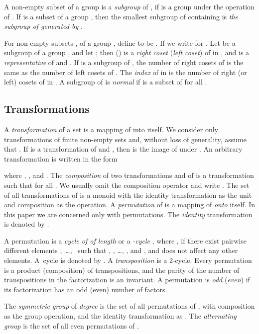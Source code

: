 \documentclass{llncs}
\begin{document}
A non-empty subset  of a group  is a \emph{subgroup} of , if 
 is a group under the operation of .
If  is a subset of a group , then the smallest subgroup of  containing  is \emph{the subgroup of  generated by }.

For non-empty subsets ,  of a group , define
 to be .
If  we write  for .
Let  be a subgroup of a group , and let ; then  () is a 
\emph{right coset} (\emph{left coset}) of  in , and  is a \emph{representative} of  and .
If  is a subgroup of , the number of right cosets of  is the same as the number of left cosets of . The \emph{index} of  in  is the number of right (or left) cosets of  in .
A subgroup  of  is \emph{normal} if  is a subset of  for all .


\subsection{Transformations}

A {\em transformation} of a set  is a mapping of  into itself. 
We consider only transformations of finite non-empty sets and, 
without loss of generality, assume that . If  is a transformation of 
and  , then  is the image of  under .  
An arbitrary transformation is written in the form

where , , and . 
The {\em composition} of two transformations  and  of  is a transformation  such that  for all . We usually omit the composition operator and write . 
The set of all transformations of  is a monoid with the identity transformation as the unit and composition as the operation.
A \emph{permutation} of  is a mapping of  \emph{onto} itself. 
In this paper we are concerned only with permutations.
The \emph{identity} transformation is denoted by .

A permutation  is a \emph{cycle of of length } or a  \emph{-cycle} , where , if there exist pairwise different elements ,~\dots,~ such that
, , \dots, , and , and  does not affect any other elements.
A~cycle is denoted by .
A \emph{transposition} is a 2-cycle.  
Every permutation is a product (composition) of transpositions, and the parity of the number of transpositions in the factorization is an invariant. A permutation is \emph{odd} (\emph{even}) if its factorization has an odd (even) number of factors.

The \emph{symmetric group}  of \emph{degree}  is the set of all permutations of , with composition as the group operation, and the identity transformation as .
The \emph{alternating group}  is the set of all even permutations of .
\end{document}
